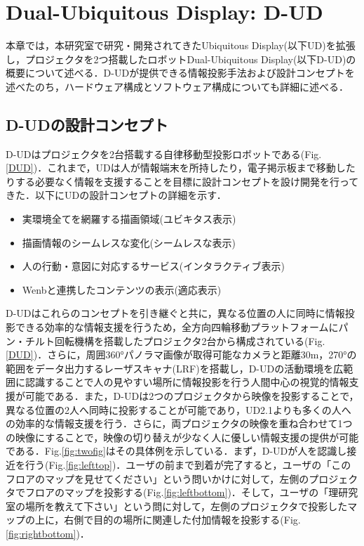 \documentclass[12pt]{sonota/aislab}
\begin{document}
\chapter{Dual-Ubiquitous Display: D-UD}\label{chap:d_ud_mechanism}
本章では，本研究室で研究・開発されてきたUbiquitous Display(以下UD)を拡張し，プロジェクタを2つ搭載したロボットDual-Ubiquitous Display(以下D-UD)の概要について述べる．D-UDが提供できる情報投影手法および設計コンセプトを述べたのち，ハードウェア構成とソフトウェア構成についても詳細に述べる．

\section{D-UDの設計コンセプト}
D-UDはプロジェクタを2台搭載する自律移動型投影ロボットである(Fig.\ref{DUD})．これまで，UDは人が情報端末を所持したり，電子掲示板まで移動したりする必要なく情報を支援することを目標に設計コンセプトを設け開発を行ってきた\cite{UD1}．以下にUDの設計コンセプトの詳細を示す．

\begin{itemize}
\item 実環境全てを網羅する描画領域(ユビキタス表示)
\item 描画情報のシームレスな変化(シームレスな表示)
\item 人の行動・意図に対応するサービス(インタラクティブ表示)
\item Wenbと連携したコンテンツの表示(適応表示)
\end{itemize}

D-UDはこれらのコンセプトを引き継ぐと共に，異なる位置の人に同時に情報投影できる効率的な情報支援を行うため，全方向四輪移動プラットフォームにパン・チルト回転機構を搭載したプロジェクタ2台から構成されている(Fig.\ref{DUD})．さらに，周囲360°パノラマ画像が取得可能なカメラと距離30m，270°の範囲をデータ出力するレーザスキャナ(LRF)を搭載し，D-UDの活動環境を広範囲に認識することで人の見やすい場所に情報投影を行う人間中心の視覚的情報支援が可能である．また，D-UDは2つのプロジェクタから映像を投影することで，異なる位置の2人へ同時に投影することが可能であり，UD2.1よりも多くの人への効率的な情報支援を行う．さらに，両プロジェクタの映像を重ね合わせて1つの映像にすることで，映像の切り替えが少なく人に優しい情報支援の提供が可能である．Fig.\ref{fig:twofig}はその具体例を示している．まず，D-UDが人を認識し接近を行う(Fig.\ref{fig:lefttop})．ユーザの前まで到着が完了すると，ユーザの「このフロアのマップを見せてください」という問いかけに対して，左側のプロジェクタでフロアのマップを投影する(Fig.\ref{fig:leftbottom})．そして，ユーザの「理研究室の場所を教えて下さい」という問に対して，左側のプロジェクタで投影したマップの上に，右側で目的の場所に関連した付加情報を投影する(Fig.\ref{fig:rightbottom})．
\end{document}
